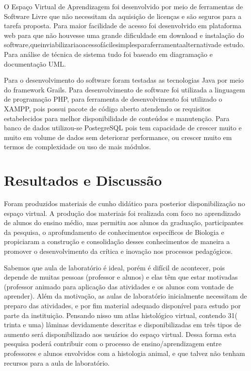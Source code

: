 \documentclass[article,12pt,onesidea,4paper,english,brazil]{abntex2}
\begin{document}
	O Espaço Virtual de Aprendizagem foi desenvolvido por meio de ferramentas de Software Livre que não necessitam da aquisição de licenças e são seguros para a tarefa proposta. Para maior facilidade de acesso foi desenvolvido em plataforma web para que não houvesse uma grande dificuldade em download e instalação do software,queinviabilizariaoacessofácilesimplesparaferramentaalternativade estudo. Para análise de técnica de sistema tudo foi baseado em diagramação e documentação UML.
	
	Para o desenvolvimento do software foram testadas as tecnologias Java por meio do framework Grails. Para desenvolvimento de software foi utilizada a linguagem de programação PHP, para ferramenta de desenvolvimento foi utilizado o XAMPP, pois possui pacote de código aberto atendendo os requisitos estabelecidos para melhor disponibilidade de conteúdos e manutenção. Para banco de dados utilizou-se PostegreSQL pois tem capacidade de crescer muito e muito em volume de dados sem deteriorar performance, ou crescer muito em termos de complexidade ou uso de mais módulos.
	
	
	
	\section*{Resultados e Discussão}
	
Foram produzidos materiais de cunho didático para posterior disponibilização no espaço virtual. A produção dos materiais foi realizada com foco no aprendizado de alunos do ensino médio, mas permitiu aos alunos da graduação, participantes da pesquisa, o aprofundamento de conhecimentos específicos de Biologia e propiciaram a construção e consolidação desses conhecimentos de maneira a promover o desenvolvimento da crítica e inovação nos processos pedagógicos.

Sabemos que aula de laboratório é ideal, porém é difícil de acontecer, pois depende de muitas pessoas (professor e alunos) e elas têm que estar motivadas (professor animado para aplicação das atividades e os alunos com vontade de aprender). Além da motivação, as aulas de laboratório inicialmente necessitam de preparo das atividades, e por fim material adequado disponível para estudo por parte da instituição. Pensando nisso um atlas histológico virtual, contendo 31( trinta e  uma) lâminas devidamente descritas e disponibilizadas em três tipos de aumento será disponibilizado aos usuários do espaço virtual. Dessa forma esta pesquisa poderá contribuir com o processo de ensino/aprendizagem entre professores e alunos envolvidos com a histologia animal, e que talvez não tenham recursos para a aula de laboratório.
\end{document}
